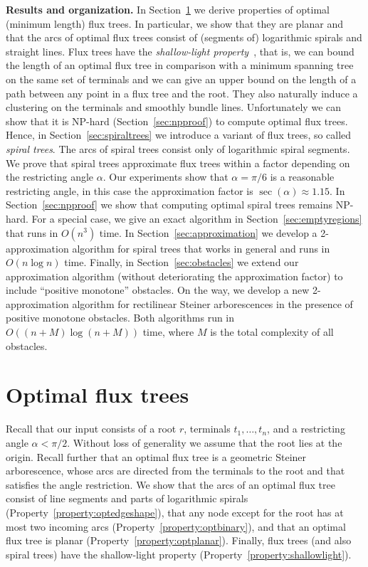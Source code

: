 \documentclass{journalA4}
\begin{document}
\smallskip\noindent
{\bfseries Results and organization.} In Section~\ref{sec:props} we derive properties of optimal (minimum length) flux trees. In particular, we show that they are planar and that the arcs of optimal flux trees consist of (segments of) logarithmic spirals and straight lines.
Flux trees have the \emph{shallow-light property}~\cite{Awerbuch1990}, that is, we can bound the length of an optimal flux tree in comparison with a minimum spanning tree on the same set of terminals and we can give an upper bound on the length of a path between any point in a flux tree and the root.
They also naturally induce a clustering on the terminals and smoothly bundle lines.
Unfortunately we can show
that it is NP-hard (Section~\ref{sec:npproof}) to compute optimal flux trees. Hence, in Section~\ref{sec:spiraltrees} we introduce a variant of flux trees, so called \emph{spiral trees}. The arcs of spiral trees consist only of logarithmic spiral segments. We prove that spiral trees approximate flux trees within a factor depending on the restricting angle $\alpha$. Our experiments show that $\alpha = \pi/6$ is a reasonable restricting angle, in this case the approximation factor is \mbox{$\sec(\alpha) \approx 1.15$}. In Section~\ref{sec:npproof} we show that computing optimal spiral trees remains NP-hard. For a special case, we give an exact algorithm in Section~\ref{sec:emptyregions} that runs in $O(n^3)$ time. In Section~\ref{sec:approximation} we develop a 2-approximation algorithm for spiral trees that works in general and runs in $O(n \log n)$ time. Finally, in Section~\ref{sec:obstacles} we extend our approximation algorithm (without deteriorating the approximation factor) to include ``positive monotone'' obstacles. On the way, we develop a new 2-approximation algorithm for rectilinear Steiner arborescences in the presence of positive monotone obstacles. Both algorithms run in $O((n+M) \log(n+M))$ time, where $M$ is the total complexity of all obstacles.

\section{Optimal flux trees} \label{sec:props}

Recall that our input consists of a root $r$, terminals $t_1, \ldots, t_n$, and a restricting angle $\alpha < \pi/2$. Without loss of generality we assume that the root lies at the origin. Recall further that an optimal flux tree is a geometric Steiner arborescence, whose arcs are directed from the terminals to the root and that satisfies the angle restriction. We show that the arcs of an optimal flux tree consist of line segments and parts of logarithmic spirals (Property~\ref{property:optedgeshape}), that any node except for the root has at most two incoming arcs (Property~\ref{property:optbinary}), and that an optimal flux tree is planar (Property~\ref{property:optplanar}). Finally, flux trees (and also spiral trees) have the shallow-light property (Property~\ref{property:shallowlight}).
\end{document}
